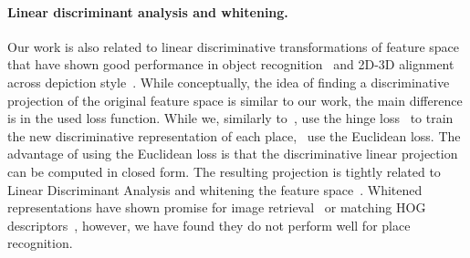 \paragraph{Linear discriminant analysis and whitening.}
  \textcolor{petr}{
 Our work is also related to linear discriminative transformations of feature space that have shown good performance in object recognition~\cite{Gharbi12,Hariharan12} and 2D-3D alignment across depiction style~\cite{Aubry13}. While conceptually, the idea of finding a discriminative projection of the original feature space is similar to our work, the main difference is in the used loss function. 
  While we, similarly to~\cite{Malisiewicz11,Shrivastava11}, use the hinge loss~\cite{Bishop06} to train the new discriminative representation of each place,~\cite{Aubry13,Gharbi12,Hariharan12} use the Euclidean loss. The advantage of using the Euclidean loss is that the discriminative linear projection can be computed in closed form. The resulting projection is tightly related to Linear Discriminant Analysis and whitening the feature space~\cite{Aubry13,Gharbi12,Hariharan12}. Whitened representations have shown promise 
  for image retrieval~\cite{JegouChum12} or matching HOG~\cite{Dalal05} descriptors~\cite{Doersch13}, however, we have found they do not perform well for place recognition.
  }
    
 
  




